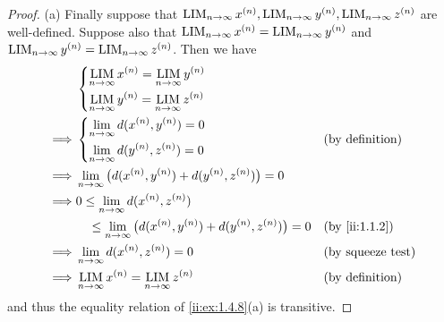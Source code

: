 \begin{proof}{(a)}
  Finally suppose that \(\operatorname*{LIM}_{n \to \infty} x^{(n)}, \operatorname*{LIM}_{n \to \infty} y^{(n)}, \operatorname*{LIM}_{n \to \infty} z^{(n)}\) are well-defined.
  Suppose also that \(\operatorname*{LIM}_{n \to \infty} x^{(n)} = \operatorname*{LIM}_{n \to \infty} y^{(n)}\) and \(\operatorname*{LIM}_{n \to \infty} y^{(n)} = \operatorname*{LIM}_{n \to \infty} z^{(n)}\).
  Then we have
  \begin{align*}
             & \begin{dcases}
                 \LIM_{n \to \infty} x^{(n)} = \LIM_{n \to \infty} y^{(n)} \\
                 \LIM_{n \to \infty} y^{(n)} = \LIM_{n \to \infty} z^{(n)}
               \end{dcases}                                                            \\
    \implies & \begin{dcases}
                 \lim_{n \to \infty} d(x^{(n)}, y^{(n)}) = 0 \\
                 \lim_{n \to \infty} d(y^{(n)}, z^{(n)}) = 0
               \end{dcases}                                         &  & \text{(by definition)}                                     \\
    \implies & \lim_{n \to \infty} \big(d(x^{(n)}, y^{(n)}) + d(y^{(n)}, z^{(n)})\big) = 0                                          \\
    \implies & 0 \leq \lim_{n \to \infty} d(x^{(n)}, z^{(n)})                                                                       \\
             & \quad \leq \lim_{n \to \infty} \big(d(x^{(n)}, y^{(n)}) + d(y^{(n)}, z^{(n)})\big) = 0 &  & \by{ii:1.1.2}            \\
    \implies & \lim_{n \to \infty} d(x^{(n)}, z^{(n)}) = 0                                            &  & \text{(by squeeze test)} \\
    \implies & \LIM_{n \to \infty} x^{(n)} = \LIM_{n \to \infty} z^{(n)}                              &  & \text{(by definition)}
  \end{align*}
  and thus the equality relation of \cref{ii:ex:1.4.8}(a) is transitive.
\end{proof}

